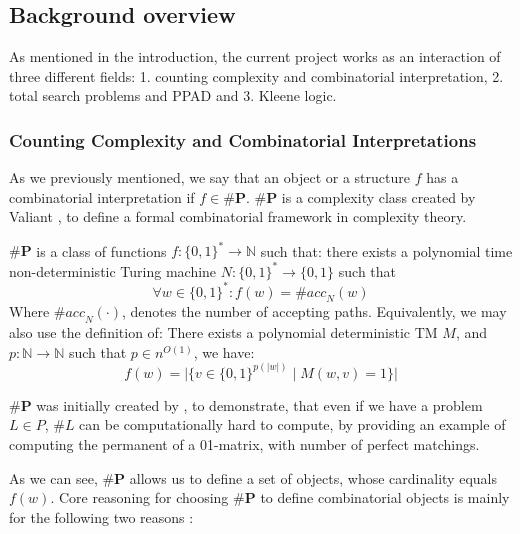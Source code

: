 

\subsection{Background overview}


As mentioned in the introduction, the current project works as an interaction
of three different fields: 1. counting complexity and combinatorial interpretation, 
2. total search problems and PPAD and 3. Kleene logic.


\subsubsection{Counting Complexity and Combinatorial Interpretations}
As we previously mentioned, we say that an object or a structure $f$
has a combinatorial interpretation if $f \in \textbf{\#P}$. $\textbf{\#P}$
is a complexity class created by Valiant \cite{valiantComplexityComputingPermanent1979},
to define a formal combinatorial framework in complexity theory.


\begin{definition}
    $\textbf{\#P}$ is a class of functions $f: \{0,1\}^* \to \mathbb{N}$
    such that: there exists a polynomial time non-deterministic
    Turing machine $N: \{0,1\}^* \to \{0,1\}$ such that
    $$
    \forall w \in \{0,1\}^*: f(w) = \textit{\#acc}_N(w)
    $$
    Where $\textit{\#acc}_N(\cdot)$, denotes the number of accepting paths.
    Equivalently, we may also use the definition of: There
    exists a polynomial deterministic TM $M$, and
    $p : \mathbb{N} \to \mathbb{N}$ such that $p \in n^{O(1)}$, we have:
    $$
    f(w) = \Big|\Big\{v \in \{0,1\}^{p(|w|)} \mid M(w, v) =1 \Big\}\Big|
    $$
\end{definition}

$\textbf{\#P}$ was initially created by \cite{valiantComplexityComputingPermanent1979},
to demonstrate, that even if we have a problem $L \in P$, $\#L$ can be computationally
hard to compute, by providing an example of computing the permanent of
a 01-matrix, with number of perfect matchings. 

As we can see, $\textbf{\#P}$ allows us to define a set of objects,
whose cardinality equals $f(w)$. Core reasoning for choosing
$\textbf{\#P}$ to define combinatorial objects is mainly for the 
following two reasons \cite{ikenmeyerPositivitySymmetricGroup2024}: 


